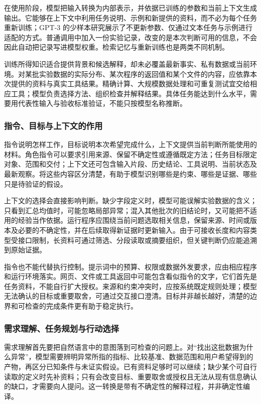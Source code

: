 \documentclass[11pt,a4paper]{article}
\begin{document}
在使用阶段，模型把输入转换为内部表示，并依据已训练的参数和当前上下文生成输出。它能够在上下文中利用任务说明、示例和新提供的资料，而不必为每个任务重新训练；GPT-3 的少样本研究展示了不更新参数、仅通过文本任务与示例进行适配的方式\cite{gpt3-fewshot}。普通调用中加入一份实验记录，改变的是本次判断可用的信息，不会因此自动把记录写进模型权重。检索记忆与重新训练也是两类不同机制。

训练所得知识适合提供背景和候选解释，却未必覆盖最新事实、私有数据或当前环境。对某批实验数据的实际分布、某次程序的返回值和某个文件的内容，应依靠本次提供的资料与真实工具结果。精确计算、大规模数据处理和可重复测试宜交给相应工具；模型负责选择方法、组织检查并解释结果。具体任务能达到什么水平，需要用代表性输入与验收标准验证，不能只按模型名称推断。

\subsubsection{指令、目标与上下文的作用}

指令说明怎样工作，目标说明本次希望完成什么，上下文提供当前判断所能使用的材料。角色指令可以要求引用来源、保留不确定性或遵循既定方法；任务目标限定对象、范围和交付；上下文还可包含输入片段、历史结论、工具说明、当前状态及最新观察。将这些内容区分清楚，有助于模型识别哪些是约束、哪些是证据、哪些只是待验证的假设。

上下文的选择会直接影响判断。缺少字段定义时，模型可能误解实验数据的含义；只看到汇总均值时，可能忽略局部异常；混入其他批次的旧结论时，又可能把不适用的经验当作依据。运行程序应围绕当前问题选取相关信息，保留来源、时间或版本及必要的不确定性，并在后续取得新证据时更新输入。由于可接收长度和内容类型受接口限制，长资料可通过筛选、分段读取或摘要组织，但关键判断仍应能追溯到原始证据。

指令也不能代替执行控制。提示词中的预算、权限或数据外发要求，应由相应程序和运行环境落实。网页、文件或工具返回中可能包含看似指令的文字，它们首先是任务资料，不能自行扩大授权。来源和约束冲突时，应按系统既定规则处理；模型无法确认的目标或重要取舍，可通过交互接口澄清。目标并非越长越好，清楚的边界和可检查的完成条件更有助于稳定执行。

\subsubsection{需求理解、任务规划与行动选择}

需求理解首先要把自然语言中的意图落到可检查的问题上。对“找出这批数据为什么异常”，模型需要辨明异常所指的指标、比较基准、数据范围和用户希望得到的产物，再区分已知条件与未证实假设。已有资料足够时可以继续；缺少某个可自行读取的定义时先补资料；只有会改变目标、重要取舍或授权且无法从现有信息确认的缺口，才需要向人提问。这一转换是带有不确定性的解释过程，并非确定性编译。
\end{document}
